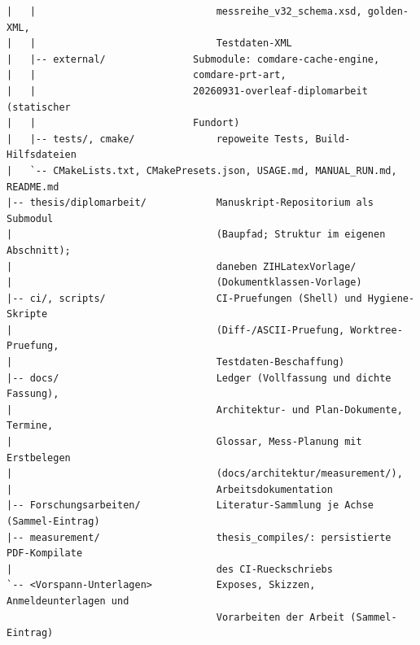 {\begin{verbatim}
|   |                               messreihe_v32_schema.xsd, golden-XML,
|   |                               Testdaten-XML
|   |-- external/               Submodule: comdare-cache-engine,
|   |                           comdare-prt-art,
|   |                           20260931-overleaf-diplomarbeit (statischer
|   |                           Fundort)
|   |-- tests/, cmake/              repoweite Tests, Build-Hilfsdateien
|   `-- CMakeLists.txt, CMakePresets.json, USAGE.md, MANUAL_RUN.md, README.md
|-- thesis/diplomarbeit/            Manuskript-Repositorium als Submodul
|                                   (Baupfad; Struktur im eigenen Abschnitt);
|                                   daneben ZIHLatexVorlage/
|                                   (Dokumentklassen-Vorlage)
|-- ci/, scripts/                   CI-Pruefungen (Shell) und Hygiene-Skripte
|                                   (Diff-/ASCII-Pruefung, Worktree-Pruefung,
|                                   Testdaten-Beschaffung)
|-- docs/                           Ledger (Vollfassung und dichte Fassung),
|                                   Architektur- und Plan-Dokumente, Termine,
|                                   Glossar, Mess-Planung mit Erstbelegen
|                                   (docs/architektur/measurement/),
|                                   Arbeitsdokumentation
|-- Forschungsarbeiten/             Literatur-Sammlung je Achse (Sammel-Eintrag)
|-- measurement/                    thesis_compiles/: persistierte PDF-Kompilate
|                                   des CI-Rueckschriebs
`-- <Vorspann-Unterlagen>           Exposes, Skizzen, Anmeldeunterlagen und
                                    Vorarbeiten der Arbeit (Sammel-Eintrag)
\end{verbatim}
}

